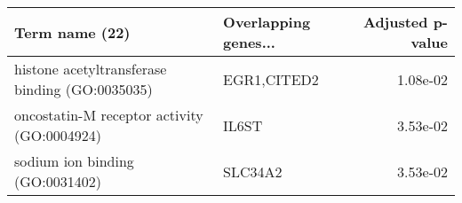 \begin{tabular}{llr}
\toprule
                                Term name (22) & Overlapping genes... &  Adjusted p-value \\
\midrule
histone acetyltransferase binding (GO:0035035) &          EGR1,CITED2 &          1.08e-02 \\
   oncostatin-M receptor activity (GO:0004924) &                IL6ST &          3.53e-02 \\
               sodium ion binding (GO:0031402) &              SLC34A2 &          3.53e-02 \\
\bottomrule
\end{tabular}
